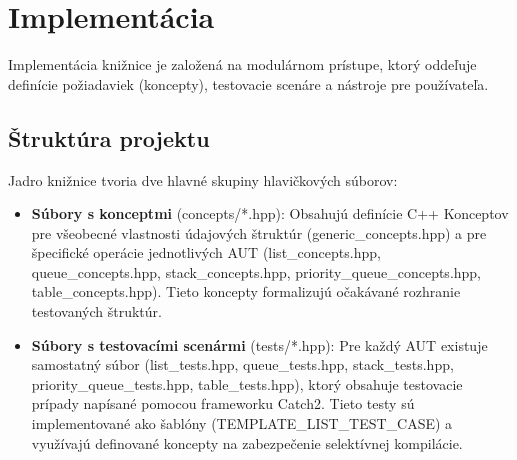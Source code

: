 \documentclass[11pt]{article}
\begin{document}
\newpage
\section{Implementácia}

Implementácia knižnice je založená na modulárnom prístupe, ktorý oddeľuje definície požiadaviek (koncepty), testovacie scenáre a nástroje pre používateľa.

\subsection{Štruktúra projektu}

Jadro knižnice tvoria dve hlavné skupiny hlavičkových súborov:

\begin{itemize}
  \item \textbf{Súbory s konceptmi} (concepts/*.hpp): Obsahujú definície C++ Konceptov pre všeobecné vlastnosti údajových štruktúr (generic\_concepts.hpp) a pre špecifické operácie jednotlivých AUT (list\_concepts.hpp, queue\_concepts.hpp, stack\_concepts.hpp, priority\_queue\_concepts.hpp, table\_concepts.hpp). Tieto koncepty formalizujú očakávané rozhranie testovaných štruktúr.
  \item \textbf{Súbory s testovacími scenármi} (tests/*.hpp): Pre každý AUT existuje samostatný súbor (list\_tests.hpp, queue\_tests.hpp, stack\_tests.hpp, priority\_queue\_tests.hpp, table\_tests.hpp), ktorý obsahuje testovacie prípady napísané pomocou frameworku Catch2. Tieto testy sú implementované ako šablóny (TEMPLATE\_LIST\_TEST\_CASE) a využívajú definované koncepty na zabezpečenie selektívnej kompilácie.
\end{itemize}
\end{document}
